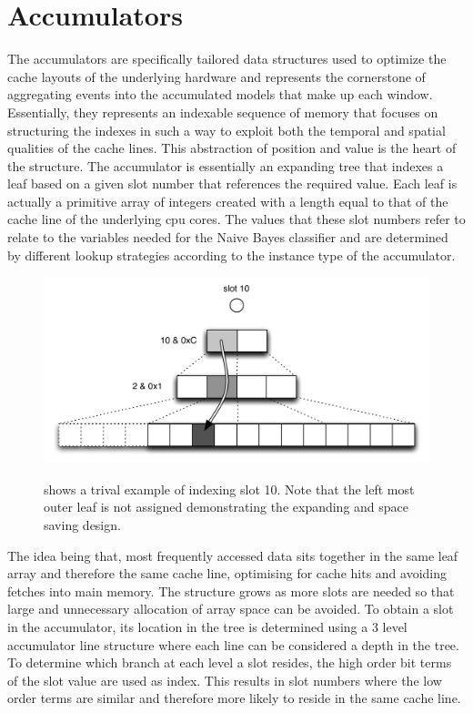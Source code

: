 \documentclass[a4paper,11pt]{scrreprt}
\begin{document}
\section{Accumulators}
The accumulators are specifically tailored data structures used to optimize the cache layouts of the underlying hardware and represents the cornerstone of aggregating events into the accumulated models that make up each window. Essentially, they represents an indexable sequence of memory that focuses on structuring the indexes in such a way to exploit both the temporal and spatial qualities of the cache lines. This abstraction of position and value is the heart of the structure. The accumulator is essentially an expanding tree that indexes a leaf based on a given slot number that references the required value. Each leaf is actually a primitive array of integers created with a length equal to that of the cache line of the underlying \acrshort{cpu} cores. The values that these slot numbers refer to relate to the variables needed for the Naive Bayes classifier and are determined by different lookup strategies according to the instance type of the accumulator. \\
\begin{figure}[h!]
\centering
\caption{shows a trival example of indexing slot 10. Note that the left most outer leaf is not assigned demonstrating the expanding and space saving design.}
\includegraphics[scale=0.72, trim=0 0 0 12, clip=true] {accumulator-lookup.pdf}
\label{fig:accumulator-lookup}
\end{figure}

The idea being that, most frequently accessed data sits together in the same leaf array and therefore the same cache line, optimising for cache hits and avoiding fetches into main memory. The structure grows as more slots are needed so that large and unnecessary allocation of array space can be avoided. To obtain a slot in the accumulator, its location in the tree is determined using a 3 level accumulator line structure where each line can be considered a depth in the tree. To determine which branch at each level a slot resides, the high order bit terms of the slot value are used as index. This results in slot numbers where the low order terms are similar and therefore more likely to reside in the same cache line.
\end{document}
